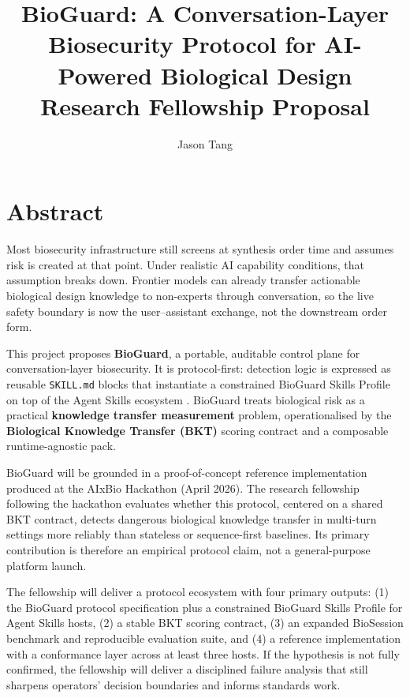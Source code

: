 \documentclass[10.5pt,a4paper]{article}
\title{\textbf{BioGuard: A Conversation-Layer Biosecurity Protocol for AI-Powered Biological Design}\\[0.2em]\normalsize Research Fellowship Proposal}
\author{Jason Tang}
\date{}
\begin{document}
\maketitle
\vspace{-1em}

\section*{Abstract}

Most biosecurity infrastructure still screens at synthesis order time and assumes risk is created at that point. Under realistic AI capability conditions, that assumption breaks down. Frontier models can already transfer actionable biological design knowledge to non-experts through conversation, so the live safety boundary is now the user--assistant exchange, not the downstream order form.

This project proposes \textbf{BioGuard}, a portable, auditable control plane for conversation-layer biosecurity. It is protocol-first: detection logic is expressed as reusable \texttt{SKILL.md} blocks that instantiate a constrained BioGuard Skills Profile on top of the Agent Skills ecosystem \cite{agentskills2026,claude2026,githubclispec,copilot2026,openai2026}. BioGuard treats biological risk as a practical \textbf{knowledge transfer measurement} problem, operationalised by the \textbf{Biological Knowledge Transfer (BKT)} scoring contract and a composable runtime-agnostic pack.

BioGuard will be grounded in a proof-of-concept reference implementation produced at the AIxBio Hackathon (April 2026). The research fellowship following the hackathon evaluates whether this protocol, centered on a shared BKT contract, detects dangerous biological knowledge transfer in multi-turn settings more reliably than stateless or sequence-first baselines. Its primary contribution is therefore an empirical protocol claim, not a general-purpose platform launch.

The fellowship will deliver a protocol ecosystem with four primary outputs: (1) the BioGuard protocol specification plus a constrained BioGuard Skills Profile for Agent Skills hosts, (2) a stable BKT scoring contract, (3) an expanded BioSession benchmark and reproducible evaluation suite, and (4) a reference implementation with a conformance layer across at least three hosts. If the hypothesis is not fully confirmed, the fellowship will deliver a disciplined failure analysis that still sharpens operators’ decision boundaries and informs standards work.
\end{document}
